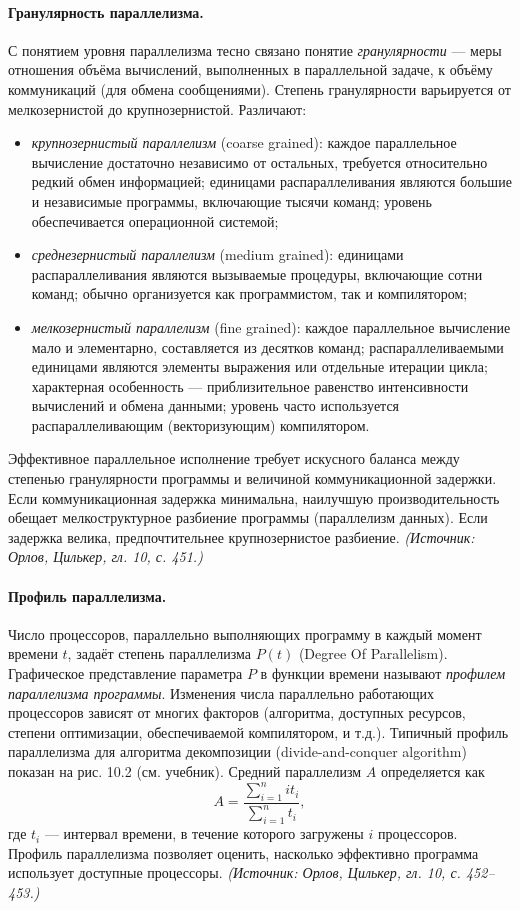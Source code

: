 \documentclass[a4paper,12pt]{article}
\begin{document}
\paragraph{Гранулярность параллелизма.}
С понятием уровня параллелизма тесно связано понятие \emph{гранулярности} — меры отношения объёма вычислений, выполненных в параллельной задаче, к объёму коммуникаций (для обмена сообщениями). Степень гранулярности варьируется от мелкозернистой до крупнозернистой. Различают:
\begin{itemize}
\item \emph{крупнозернистый параллелизм} (coarse grained): каждое параллельное вычисление достаточно независимо от остальных, требуется относительно редкий обмен информацией; единицами распараллеливания являются большие и независимые программы, включающие тысячи команд; уровень обеспечивается операционной системой;
\item \emph{среднезернистый параллелизм} (medium grained): единицами распараллеливания являются вызываемые процедуры, включающие сотни команд; обычно организуется как программистом, так и компилятором;
\item \emph{мелкозернистый параллелизм} (fine grained): каждое параллельное вычисление мало и элементарно, составляется из десятков команд; распараллеливаемыми единицами являются элементы выражения или отдельные итерации цикла; характерная особенность — приблизительное равенство интенсивности вычислений и обмена данными; уровень часто используется распараллеливающим (векторизующим) компилятором.
\end{itemize}
Эффективное параллельное исполнение требует искусного баланса между степенью гранулярности программы и величиной коммуникационной задержки. Если коммуникационная задержка минимальна, наилучшую производительность обещает мелкоструктурное разбиение программы (параллелизм данных). Если задержка велика, предпочтительнее крупнозернистое разбиение.
\textit{(Источник: Орлов, Цилькер, гл. 10, с. 451.)}

\paragraph{Профиль параллелизма.}
Число процессоров, параллельно выполняющих программу в каждый момент времени \(t\), задаёт степень параллелизма \(P(t)\) (Degree Of Parallelism). Графическое представление параметра \(P\) в функции времени называют \emph{профилем параллелизма программы}. Изменения числа параллельно работающих процессоров зависят от многих факторов (алгоритма, доступных ресурсов, степени оптимизации, обеспечиваемой компилятором, и т.д.). Типичный профиль параллелизма для алгоритма декомпозиции (divide-and-conquer algorithm) показан на рис. 10.2 (см. учебник). Средний параллелизм \(A\) определяется как
\[
A=\frac{\sum_{i=1}^{n} i t_i}{\sum_{i=1}^{n} t_i},
\]
где \(t_i\) — интервал времени, в течение которого загружены \(i\) процессоров. Профиль параллелизма позволяет оценить, насколько эффективно программа использует доступные процессоры.
\textit{(Источник: Орлов, Цилькер, гл. 10, с. 452--453.)}
\end{document}
